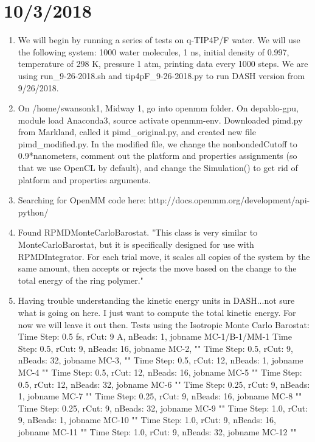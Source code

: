\documentclass[12pt,reqno]{amsart}
\numberwithin{equation}{section}
\begin{document}
\section{10/3/2018}
\begin{enumerate}
\item We will begin by running a series of tests on q-TIP4P/F water.  We will use the following system: 1000 water molecules, 1 ns, initial density of 0.997, temperature of 298 K, pressure 1 atm, printing data every 1000 steps.  We are using run\_9-26-2018.sh and tip4pF\_9-26-2018.py to run DASH version from 9/26/2018.  
\item On /home/swansonk1, Midway 1, go into openmm folder.  On depablo-gpu, module load Anaconda3, source activate openmm-env.  Downloaded pimd.py from Markland, called it pimd\_original.py, and created new file pimd\_modified.py.  In the modified file, we change the nonbondedCutoff to 0.9*nanometers, comment out the platform and properties assignments (so that we use OpenCL by default), and change the Simulation() to get rid of platform and properties arguments.  
\item Searching for OpenMM code here: http://docs.openmm.org/development/api-python/
\item Found RPMDMonteCarloBarostat.  "This class is very similar to MonteCarloBarostat, but it is specifically designed for use with RPMDIntegrator.  For each trial move, it scales all copies of the system by the same amount, then accepts or rejects the move based on the change to the total energy of the ring polymer."
\item Having trouble understanding the kinetic energy units in DASH...not sure what is going on here.  I just want to compute the total kinetic energy.  For now we will leave it out then.  
\subitem Tests using the Isotropic Monte Carlo Barostat:
\subsubitem Time Step: 0.5 fs, rCut: 9 A, nBeads: 1, jobname MC-1/B-1/MM-1
\subsubitem Time Step: 0.5, rCut: 9, nBeads: 16, jobname MC-2, ""
\subsubitem Time Step: 0.5, rCut: 9, nBeads: 32, jobname MC-3, ""
\subsubitem Time Step: 0.5, rCut: 12, nBeads: 1, jobname MC-4 ""
\subsubitem Time Step: 0.5, rCut: 12, nBeads: 16, jobname MC-5 ""
\subsubitem Time Step: 0.5, rCut: 12, nBeads: 32, jobname MC-6 ""
\subsubitem Time Step: 0.25, rCut: 9, nBeads: 1, jobname MC-7 ""
\subsubitem Time Step: 0.25, rCut: 9, nBeads: 16, jobname MC-8 ""
\subsubitem Time Step: 0.25, rCut: 9, nBeads: 32, jobname MC-9 ""
\subsubitem Time Step: 1.0, rCut: 9, nBeads: 1, jobname MC-10 ""
\subsubitem Time Step: 1.0, rCut: 9, nBeads: 16, jobname MC-11 ""
\subsubitem Time Step: 1.0, rCut: 9, nBeads: 32, jobname MC-12 ""
\end{enumerate}
\end{document}

